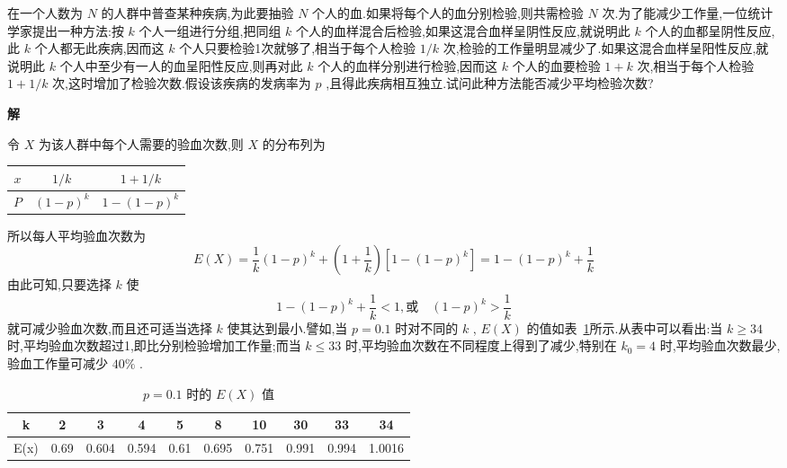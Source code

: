 \begin{example}\label{exam:2.2.2}
	在一个人数为 $ N $ 的人群中普查某种疾病,为此要抽验 $ N $ 个人的血.如果将每个人的血分别检验,则共需检验 $ N $ 次.为了能减少工作量,一位统计学家提出一种方法:按 $ k $ 个人一组进行分组,把同组 $ k $ 个人的血样混合后检验,如果这混合血样呈阴性反应,就说明此 $ k $ 个人的血都呈阴性反应,此 $ k $ 个人都无此疾病,因而这 $ k $ 个人只要检验1次就够了,相当于每个人检验 $ 1/k $ 次,检验的工作量明显减少了.如果这混合血样呈阳性反应,就说明此 $ k $ 个人中至少有一人的血呈阳性反应,则再对此 $ k $ 个人的血样分别进行检验,因而这 $ k $ 个人的血要检验 $ 1+k $ 次,相当于每个人检验 $ 1+1/k $ 次,这时增加了检验次数.假设该疾病的发病率为 $ p $ ,且得此疾病相互独立.试问此种方法能否减少平均检验次数?
	
	\textbf{解}
	
	令 $ X $ 为该人群中每个人需要的验血次数,则 $ X $ 的分布列为
	
	\begin{table}[htbp]
		\centering
		\begin{tabular}{c|cc}
			 $ x $ 	& $ 1 / k $ & $ 1+1 / k $ \\\midrule
			 $ P $ 	& $ (1-p)^{k} $ & $ 1-(1-p)^{k} $ \\
		\end{tabular}%
	\end{table}%
	
\end{example}

所以每人平均验血次数为
\[ 
E(X)=\frac{1}{k}(1-p)^{k}+\left(1+\frac{1}{k}\right)\left[1-(1-p)^{k}\right]=1-(1-p)^{k}+\frac{1}{k}
\]
由此可知,只要选择 $ k $ 使
\[ 
1-(1-p)^{k}+\frac{1}{k}<1, \text{或} \quad(1-p)^{k}>\frac{1}{k}
\]
就可减少验血次数,而且还可适当选择 $ k $ 使其达到最小.譬如,当 $ p=0.1 $ 时对不同的 $ k $ , $ E(X) $ 的值如表~\ref{tab:2.2.1}所示.从表中可以看出:当 $ k \geqslant 34 $ 时,平均验血次数超过1,即比分别检验增加工作量;而当 $ k \leqslant 33 $ 时,平均验血次数在不同程度上得到了减少,特别在 $ k_{0}=4 $ 时,平均验血次数最少,验血工作量可减少 $ 40\% $ .

\begin{table}[htbp]
	\centering
	\caption{ $ p=0.1 $ 时的 $ E(X) $ 值}
	\begin{tabular}{c|ccccccccc}
		\toprule
		k     & 2     & 3     & 4     & 5     & 8     & 10    & 30    & 33    & 34 \\\midrule
		E(x)  & 0.69  & 0.604 & 0.594 & 0.61  & 0.695 & 0.751 & 0.991 & 0.994 & 1.0016 \\\bottomrule
	\end{tabular}%
	\label{tab:2.2.1}%
\end{table}%


